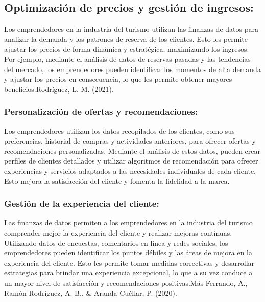 \documentclass[
  letterpaper,
  DIV=11,
  numbers=noendperiod]{scrreprt}
\begin{document}
\hypertarget{optimizaciuxf3n-de-precios-y-gestiuxf3n-de-ingresos}{%
\subsection{Optimización de precios y gestión de
ingresos:}\label{optimizaciuxf3n-de-precios-y-gestiuxf3n-de-ingresos}}

Los emprendedores en la industria del turismo utilizan las finanzas de
datos para analizar la demanda y los patrones de reserva de los
clientes. Esto les permite ajustar los precios de forma dinámica y
estratégica, maximizando los ingresos. Por ejemplo, mediante el análisis
de datos de reservas pasadas y las tendencias del mercado, los
emprendedores pueden identificar los momentos de alta demanda y ajustar
los precios en consecuencia, lo que les permite obtener mayores
beneficios.Rodríguez, L. M. (2021).

\hypertarget{personalizaciuxf3n-de-ofertas-y-recomendaciones}{%
\subsubsection{Personalización de ofertas y
recomendaciones:}\label{personalizaciuxf3n-de-ofertas-y-recomendaciones}}

Los emprendedores utilizan los datos recopilados de los clientes, como
sus preferencias, historial de compras y actividades anteriores, para
ofrecer ofertas y recomendaciones personalizadas. Mediante el análisis
de estos datos, pueden crear perfiles de clientes detallados y utilizar
algoritmos de recomendación para ofrecer experiencias y servicios
adaptados a las necesidades individuales de cada cliente. Esto mejora la
satisfacción del cliente y fomenta la fidelidad a la marca.

\hypertarget{gestiuxf3n-de-la-experiencia-del-cliente}{%
\subsubsection{Gestión de la experiencia del
cliente:}\label{gestiuxf3n-de-la-experiencia-del-cliente}}

Las finanzas de datos permiten a los emprendedores en la industria del
turismo comprender mejor la experiencia del cliente y realizar mejoras
continuas. Utilizando datos de encuestas, comentarios en línea y redes
sociales, los emprendedores pueden identificar los puntos débiles y las
áreas de mejora en la experiencia del cliente. Esto les permite tomar
medidas correctivas y desarrollar estrategias para brindar una
experiencia excepcional, lo que a su vez conduce a un mayor nivel de
satisfacción y recomendaciones positivas.Más-Ferrando, A.,
Ramón-Rodríguez, A. B., \& Aranda Cuéllar, P. (2020).
\end{document}
